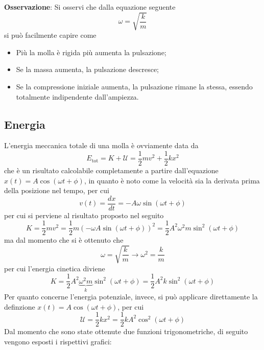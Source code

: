 \documentclass[a4paper]{extarticle}
\begin{document}
\vspace{1em}
\noindent
\textbf{Osservazione}: Si osservi che dalla equazione seguente
\[\boxed{\omega = \sqrt{\frac{k}{m}}}\]
si può facilmente capire come
\begin{itemize}
  \item Più la molla è rigida più aumenta la pulsazione;
  \item Se la massa aumenta, la pulsazione descresce;
  \item Se la compressione iniziale aumenta, la pulsazione rimane la stessa, essendo totalmente indipendente dall'ampiezza.
\end{itemize}

\vspace{1em}
\subsection{Energia}
L'energia meccanica totale di una molla è ovviamente data da
\[E_{\text{tot}} = K + \mathcal{U} = \frac{1}{2}mv^2 + \frac{1}{2}k x^2\]
che è un risultato calcolabile completamente a partire dall'equazione $x(t)=A \cos(\omega t + \phi)$, in quanto è noto come la velocità sia la derivata prima della posizione nel tempo, per cui
\[v(t) = \frac{dx}{dt} = - A \omega \sin(\omega t + \phi)\]
per cui si perviene al risultato proposto nel seguito
\[K=\frac{1}{2}mv^2=\frac{1}{2}m (- \omega A \sin(\omega t + \phi))^2 = \frac{1}{2}A^2\omega^2 m \sin^2(\omega t + \phi)\]
ma dal momento che si è ottenuto che
\[\omega = \sqrt{\frac{k}{m}} \longrightarrow \omega^2 = \frac{k}{m}\]
per cui l'energia cinetica diviene
\[K=\frac{1}{2}A^2 \underbrace{\omega^2 m}_{k} \sin^2(\omega t + \phi)=\frac{1}{2}A^2 k \sin^2(\omega t + \phi)\]
Per quanto concerne l'energia potenziale, invece, si può applicare direttamente la definzione $x(t)=A \cos(\omega t + \phi)$, per cui
\[\mathcal{U}=\frac{1}{2}kx^2=\frac{1}{2}kA^2 \cos^2(\omega t + \phi)\]
Dal momento che sono state ottenute due funzioni trigonometriche, di seguito vengono esposti i rispettivi grafici:
\end{document}
